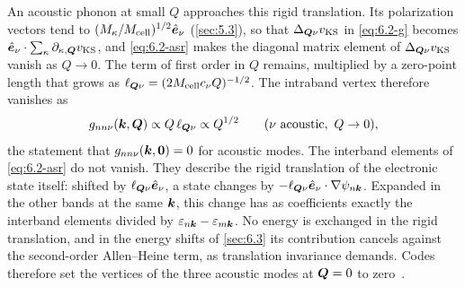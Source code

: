 An acoustic phonon at small $Q$ approaches this rigid translation. Its polarization vectors tend to $(M_\kappa/M_{\mathrm{cell}})^{1/2}\hat{\bm{e}}_\nu$ (\cref{sec:5.3}), so that $\Delta_{\bm{Q}\nu}v_{\mathrm{KS}}$ in \cref{eq:6.2-g} becomes $\hat{\bm{e}}_\nu\cdot\sum_\kappa\partial_{\kappa,\bm{Q}}v_{\mathrm{KS}}$, and \cref{eq:6.2-asr} makes the diagonal matrix element of $\Delta_{\bm{Q}\nu}v_{\mathrm{KS}}$ vanish as $Q \to 0$. The term of first order in $Q$ remains, multiplied by a zero-point length that grows as $\ell_{\bm{Q}\nu} = (2M_{\mathrm{cell}}c_\nu Q)^{-1/2}$. The intraband vertex therefore vanishes as
\begin{equation*}
  g_{nn\nu}(\bm{k},\bm{Q}) \propto Q\,\ell_{\bm{Q}\nu} \propto Q^{1/2} \qquad (\nu \text{ acoustic},\ Q \to 0) ,
\end{equation*}
the statement that $g_{nn\nu}(\bm{k},\bm{0}) = 0$ for acoustic modes. The interband elements of \cref{eq:6.2-asr} do not vanish. They describe the rigid translation of the electronic state itself: shifted by $\ell_{\bm{Q}\nu}\hat{\bm{e}}_\nu$, a state changes by $-\ell_{\bm{Q}\nu}\hat{\bm{e}}_\nu\cdot\nabla\psi_{n\bm{k}}$. Expanded in the other bands at the same $\bm{k}$, this change has as coefficients exactly the interband elements divided by $\varepsilon_{n\bm{k}} - \varepsilon_{m\bm{k}}$. No energy is exchanged in the rigid translation, and in the energy shifts of \cref{sec:6.3} its contribution cancels against the second-order Allen--Heine term, as translation invariance demands. Codes therefore set the vertices of the three acoustic modes at $\bm{Q} = 0$ to zero~\cite[below Eq.~(38)]{giustino2017electron}.

